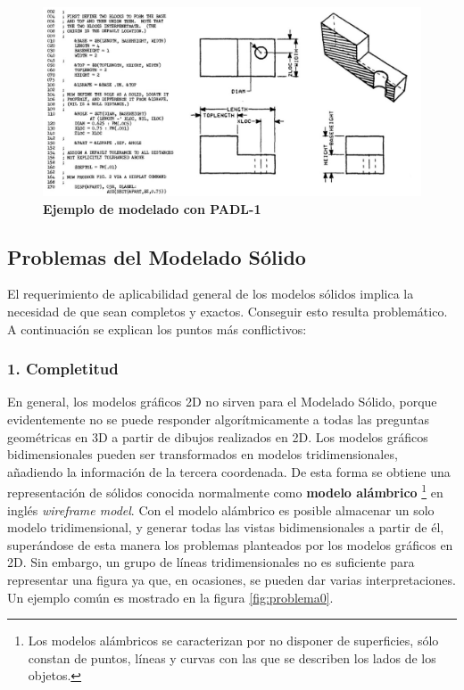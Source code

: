 \begin{figure}[h]
\includegraphics[width=16cm]{Img/GEO/geo-padl.jpg}
\centering
\caption{\textbf{\footnotesize{Ejemplo de modelado con PADL-1}}}
\end{figure}

\clearpage
\subsection{Problemas del Modelado Sólido }
\label{sectionproblema}

El requerimiento de aplicabilidad general de los modelos sólidos implica la necesidad de que sean completos y exactos. Conseguir esto resulta problemático.
A continuación se explican los puntos más conflictivos: 

\subsubsection{1. Completitud}

En general, los modelos gráficos 2D no sirven para el Modelado Sólido, porque evidentemente no se puede responder algorítmicamente a todas las preguntas geométricas en 3D a partir de dibujos realizados en 2D.
Los modelos gráficos bidimensionales pueden ser transformados en modelos tridimensionales, añadiendo la información de la tercera coordenada.
De esta forma se obtiene una representación de sólidos conocida normalmente como \textbf{modelo alámbrico} \footnote{Los modelos alámbricos se caracterizan por no disponer de superficies, sólo constan de puntos, líneas y curvas con las que se describen los lados de los objetos.} en inglés \textit{wireframe model}. Con el modelo alámbrico es posible almacenar un solo modelo tridimensional, y generar todas las vistas bidimensionales a partir de él, superándose de esta manera los problemas planteados por los modelos gráficos en 2D.
Sin embargo, un grupo de líneas tridimensionales no es suficiente para representar una figura ya que, en ocasiones, se pueden dar varias interpretaciones.
Un ejemplo común es mostrado en la figura \ref{fig:problema0}.

